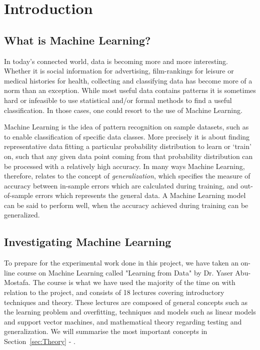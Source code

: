\section{Introduction}
\subsection{What is Machine Learning?}
In today's connected world, data is becoming more and more interesting. 
Whether it is social information for advertising, film-rankings for leisure or medical histories for health, 
collecting and classifying data has become more of a norm than an exception.
While most useful data contains patterns it is sometimes hard or infeasible to use statistical and/or formal methods 
to find a useful classification. In those cases, one could resort to the use of Machine Learning.

Machine Learning is the idea of pattern recognition on sample datasets,
such as to enable classification of specific data classes.
More precisely it is about finding representative data fitting a particular probability distribution to learn or `train' on, 
such that any given data point coming from that probability distribution can be processed with a relatively high accuracy.
In many ways Machine Learning, therefore, relates to the concept of \emph{generalization}, which specifies 
the measure of accuracy between in-sample errors which are calculated during training, and out-of-sample errors which represents the general data.
A Machine Learning model can be said to perform well, when the accuracy achieved during training can be generalized.

\subsection{Investigating Machine Learning}
To prepare for the experimental work done in this project, we have taken an on-line course
on Machine Learning called "Learning from Data" by Dr. Yaser Abu-Mostafa\cite{learningfromdata2012course}.
The course is what we have used the majority of the time on with relation to the project, and consists
of 18 lectures covering introductory techniques and theory.
These lectures are composed of general concepts such as the learning problem and overfitting, 
techniques and models such as linear models and support vector machines, 
and mathematical theory regarding testing and generalization.
We will summarise the most important concepts in Section~\ref{sec:Theory} - .

